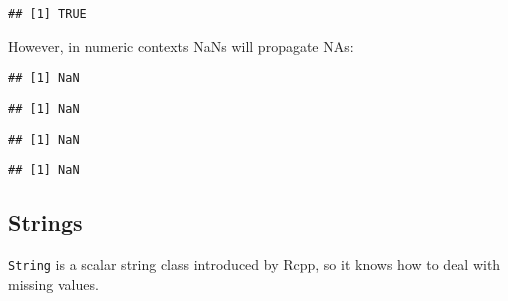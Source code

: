 \begin{verbatim}
## [1] TRUE
\end{verbatim}

However, in numeric contexts NaNs will propagate NAs:

\begin{Shaded}
\begin{Highlighting}[]
\NormalTok{(}\NormalTok{)}
\end{Highlighting}
\end{Shaded}

\begin{verbatim}
## [1] NaN
\end{verbatim}

\begin{Shaded}
\begin{Highlighting}[]
\NormalTok{(}\NormalTok{)}
\end{Highlighting}
\end{Shaded}

\begin{verbatim}
## [1] NaN
\end{verbatim}

\begin{Shaded}
\begin{Highlighting}[]
\NormalTok{(}\NormalTok{)}
\end{Highlighting}
\end{Shaded}

\begin{verbatim}
## [1] NaN
\end{verbatim}

\begin{Shaded}
\begin{Highlighting}[]
\NormalTok{(}\NormalTok{)}
\end{Highlighting}
\end{Shaded}

\begin{verbatim}
## [1] NaN
\end{verbatim}

\hypertarget{strings}{%
\subsection{Strings}\label{strings}}

\texttt{String} is a scalar string class introduced by Rcpp, so it knows
how to deal with missing values.

